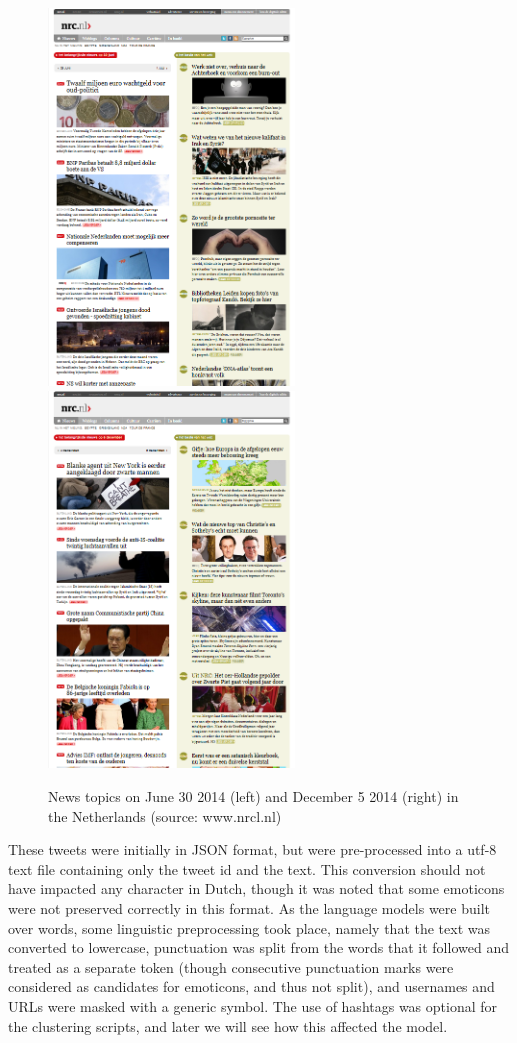 \documentclass{article}
\begin{document}
\begin{figure}
	\caption{News topics on June 30 2014 (left) and December 5 2014 (right) in the Netherlands (source: www.nrcl.nl)}
	\includegraphics[height = 10cm]{June30}
	\includegraphics[height=10cm]{December5}
\end{figure}

These tweets were initially in JSON format, but were pre-processed into a utf-8 text file containing only the tweet id and the text. This conversion should not have impacted any character in Dutch, though it was noted that some emoticons were not preserved correctly in this format. 
As the language models were built over words, some linguistic preprocessing took place, namely that the text was converted to lowercase, punctuation was split from the words that it followed and treated as a separate token (though consecutive punctuation marks were considered as candidates for emoticons, and thus not split), and usernames and URLs were masked with a generic symbol. The use of hashtags was optional for the clustering scripts, and later we will see how this affected the model.
\end{document}
